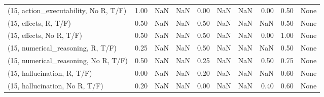 \begin{table*}[h!]
\begin{adjustbox}{width=2\columnwidth,center}
\begin{tabular}{lrrr|rrr|rrr}
(15, action\_executability, No R, T/F) &                      1.00 &                   NaN &                       NaN &                          0.00 &                       NaN &                           NaN &                                   0.00 &                               0.50 &                                  None \\
(15, effects, R, T/F)                 &                      0.50 &                   NaN &                       NaN &                          0.50 &                       NaN &                           NaN &                                    NaN &                               0.50 &                                  None \\
(15, effects, No R, T/F)              &                      0.50 &                   NaN &                       NaN &                          0.50 &                       NaN &                           NaN &                                   0.00 &                               1.00 &                                  None \\
(15, numerical\_reasoning, R, T/F)     &                      0.25 &                   NaN &                       NaN &                          0.50 &                       NaN &                           NaN &                                    NaN &                               0.50 &                                  None \\
(15, numerical\_reasoning, No R, T/F)  &                      0.50 &                   NaN &                       NaN &                          0.25 &                       NaN &                           NaN &                                   0.50 &                               0.75 &                                  None \\
(15, hallucination, R, T/F)           &                      0.00 &                   NaN &                       NaN &                          0.20 &                       NaN &                           NaN &                                    NaN &                               0.60 &                                  None \\
(15, hallucination, No R, T/F)        &                      0.20 &                   NaN &                       NaN &                          0.00 &                       NaN &                           NaN &                                   0.40 &                               0.60 &                                  None \\

\end{tabular}
\end{adjustbox}
\end{table*}
